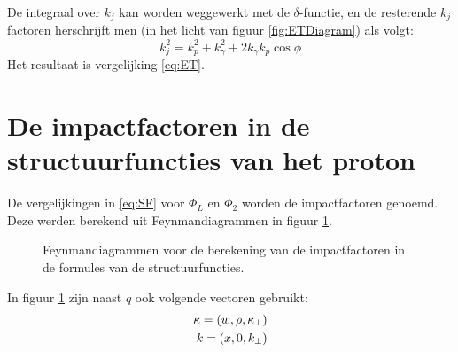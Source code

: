 \documentclass[a4paper,11pt]{article}
\numberwithin{equation}{section} %
\begin{document}
De integraal over $k_j$ kan worden weggewerkt met de $\delta$-functie, en de resterende $k_j$ factoren herschrijft men (in het licht van figuur \ref{fig:ETDiagram}) als volgt:
\begin{equation}
k_j^2 = k_p^2 + k_\gamma^2 + 2 k_\gamma k_p \cos{\phi}
\end{equation}
Het resultaat is vergelijking \eqref{eq:ET}.

\section{De impactfactoren in de structuurfuncties van het proton} \label{app:ImpactFactors}
De vergelijkingen in \eqref{eq:SF} voor $\Phi_L$ en $\Phi_2$ worden de impactfactoren genoemd.
Deze werden berekend uit Feynmandiagrammen in figuur \ref{fig:FeynmanImpactFactors}.
\begin{figure} [H]
\centering
{}
\caption{Feynmandiagrammen voor de berekening van de impactfactoren in de formules van de structuurfuncties.}
\label{fig:FeynmanImpactFactors}
\end{figure}
In figuur \ref{fig:FeynmanImpactFactors} zijn naast $q$ ook volgende vectoren gebruikt:
\begin{align}
\kappa = (w, \rho, \kappa_\perp) \notag \\
k = (x,0,k_\perp) \notag
\end{align}
\end{document}

